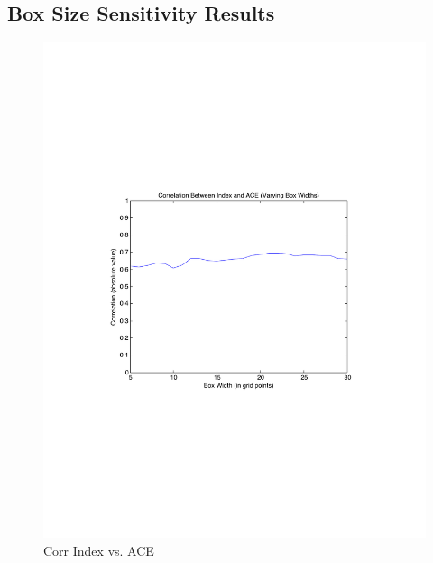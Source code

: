 \documentclass[a4paper,10pt]{article}
\begin{document}
\subsection{Box Size Sensitivity Results}
\begin{figure}[ht]
\begin{minipage}[b]{0.6\linewidth}
\includegraphics[width=\textwidth]{figs/sensitivityResults/boxSize/ACE_Index_Box_Size.pdf}
\caption{Corr Index vs. ACE}
\label{fig:figure1}
\end{minipage}
\hspace{0cm}
\begin{minipage}[b]{0.6\linewidth}

\end{minipage}
\end{figure}
\end{document}

